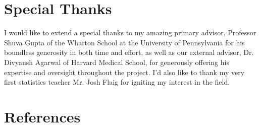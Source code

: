 \documentclass[12pt]{article}
\begin{document}
\section{Special Thanks}
I would like to extend a special thanks to my amazing primary advisor, Professor Shuva Gupta of the Wharton School at the University of Pennsylvania for his boundless generosity in both time and effort, as well as our external advisor, Dr. Divyansh Agarwal of Harvard Medical School, for generously offering his expertise and oversight throughout the project. I'd also like to thank my very first statistics teacher Mr. Josh Flaig for igniting my interest in the field.

\newpage

\section{References}
\end{document}
